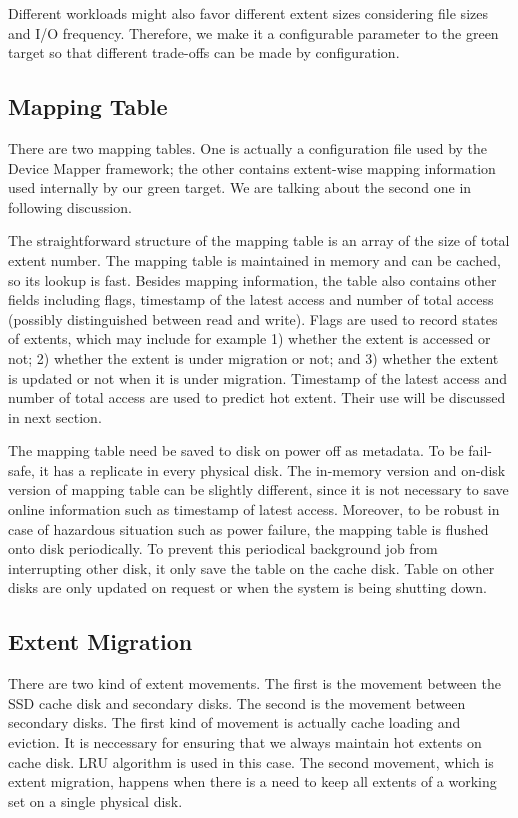 Different workloads might also favor different extent sizes
considering file sizes and I/O frequency. Therefore, we make it a
configurable parameter to the green target so that different
trade-offs can be made by configuration. 

\subsection{Mapping Table}

There are two mapping tables. One is actually a configuration file
used by the Device Mapper framework; the other contains extent-wise
mapping information used internally by our green target. We are
talking about the second one in following discussion. 

The straightforward structure of the mapping table is an array of the
size of total extent number. The mapping table is maintained in memory
and can be cached, so its lookup is fast. Besides mapping information,
the table also contains other fields including flags, timestamp of the
latest access and number of total access (possibly distinguished
between read and write). Flags are used to record states of extents,
which may include for example 1) whether the extent is accessed or
not; 2) whether the extent is under migration or not; and 3) whether
the extent is updated or not when it is under migration. Timestamp of
the latest access and number of total access are used to predict hot
extent. Their use will be discussed in next section. 

The mapping table need be saved to disk on power off as metadata. To
be fail-safe, it has a replicate in every physical disk. The in-memory
version and on-disk version of mapping table can be slightly
different, since it is not necessary to save online information such
as timestamp of latest access. Moreover, to be robust in case of
hazardous situation such as power failure, the mapping table is
flushed onto disk periodically. To prevent this periodical background
job from interrupting other disk, it only save the table on the cache
disk. Table on other disks are only updated on request or when the
system is being shutting down.


\subsection{Extent Migration}
There are two kind of extent movements. The first is the movement
between the SSD cache disk and secondary disks. The second is the
movement between secondary disks. The first kind of movement is
actually cache loading and eviction. It is neccessary for ensuring
that we always maintain hot extents on cache disk. LRU algorithm is
used in this case. The second movement, which is extent migration,
happens when there is a need to keep all extents of a working set on a
single physical disk. 

